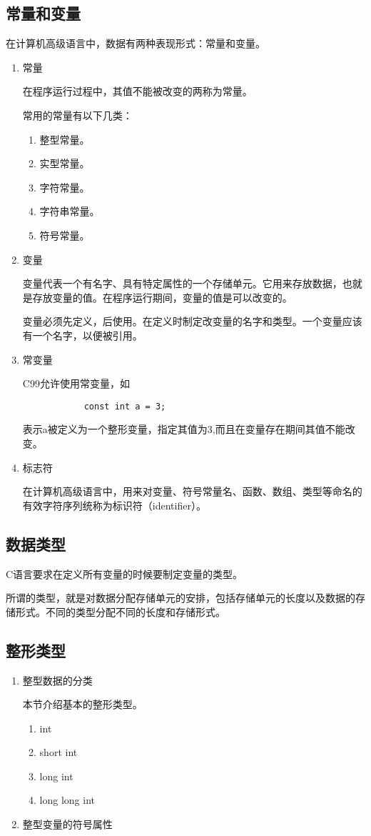\subsection{常量和变量}
在计算机高级语言中，数据有两种表现形式：常量和变量。
\begin{enumerate}
	\item 常量

		在程序运行过程中，其值不能被改变的两称为常量。

		常用的常量有以下几类：
		\begin{enumerate}
			\item 整型常量。
			\item 实型常量。
			\item 字符常量。
			\item 字符串常量。
			\item 符号常量。
		\end{enumerate}
	\item 变量

		变量代表一个有名字、具有特定属性的一个存储单元。它用来存放数据，也就是存放变量的值。在程序运行期间，变量的值是可以改变的。

		变量必须先定义，后使用。在定义时制定改变量的名字和类型。一个变量应该有一个名字，以便被引用。
	\item 常变量

		C99允许使用常变量，如
		\begin{lstlisting}
			const int a = 3;
		\end{lstlisting}
		表示a被定义为一个整形变量，指定其值为3,而且在变量存在期间其值不能改变。
	\item 标志符

		在计算机高级语言中，用来对变量、符号常量名、函数、数组、类型等命名的有效字符序列统称为标识符（identifier）。
\end{enumerate}
\subsection{数据类型}
C语言要求在定义所有变量的时候要制定变量的类型。

所谓的类型，就是对数据分配存储单元的安排，包括存储单元的长度以及数据的存储形式。不同的类型分配不同的长度和存储形式。

\subsection{整形类型}
\begin{enumerate}
	\item 整型数据的分类

		本节介绍基本的整形类型。
		
		\begin{enumerate}
			\item int
			\item short int
			\item long int
			\item long long int
		\end{enumerate}
	\item 整型变量的符号属性
\end{enumerate}
